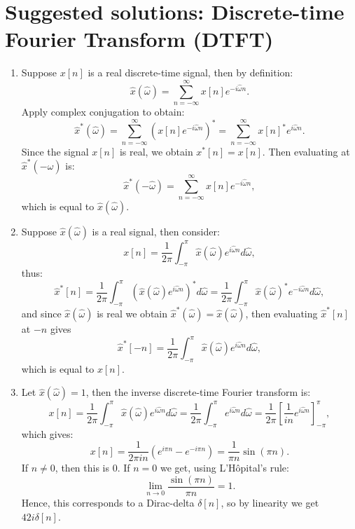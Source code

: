 
\newpage
\section{Suggested solutions: Discrete-time Fourier Transform (DTFT)}
\begin{enumerate}

  \item Suppose $x[n]$ is a real discrete-time signal, then by definition:
        \[ \hat{x}(\hat{\omega})=\sum_{n=-\infty}^{\infty}x[n]e^{-i\hat{\omega}n}. \]
        Apply complex conjugation to obtain:
        \[ \hat{x}^{*}(\hat{\omega})=\sum_{n=-\infty}^{\infty}(x[n]e^{-i\hat{\omega}n})^{*}=\sum_{n=-\infty}^{\infty}x[n]^{*}e^{i\hat{\omega}n}. \]
        Since the signal $x[n]$ is real, we obtain $x^{*}[n]=x[n]$. Then evaluating at $\hat{x}^{*}(-\hat{\omega})$ is:
        \[ \hat{x}^{*}(-\hat{\omega})=\sum_{n=-\infty}^{\infty}x[n]e^{-i\hat{\omega}n}, \]
        which is equal to $\hat{x}(\hat{\omega})$.

  \item Suppose $\hat{x}(\hat{\omega})$ is a real signal, then consider:
        \[ x[n]=\frac{1}{2\pi}\int_{-\pi}^{\pi}\hat{x}(\hat{\omega})e^{i\hat{\omega}n}d\hat{\omega}, \]
        thus:
        \[ \hat{x}^{*}[n]=\frac{1}{2\pi}\int_{-\pi}^{\pi}(\hat{x}(\hat{\omega})e^{i\hat{\omega}n})^{*}d\hat{\omega}=\frac{1}{2\pi}\int_{-\pi}^{\pi}\hat{x}(\hat{\omega})^{*}e^{-i\hat{\omega}n}d\hat{\omega}, \]
        and since $\hat{x}(\hat{\omega})$ is real we obtain $\hat{x}^{*}(\hat{\omega})=\hat{x}(\hat{\omega})$, then evaluating $\hat{x}^{*}[n]$ at $-n$ gives
        \[ \hat{x}^{*}[-n]=\frac{1}{2\pi}\int_{-\pi}^{\pi}\hat{x}(\hat{\omega})e^{i\hat{\omega}n}d\hat{\omega}, \]
        which is equal to $x[n]$.

  \item Let $\hat{x}(\hat{\omega})=1$, then the inverse discrete-time Fourier transform is:
        \[ x[n]=\frac{1}{2\pi}\int_{-\pi}^{\pi}\hat{x}(\hat{\omega})e^{i\hat{\omega}n}d\hat{\omega}=\frac{1}{2\pi}\int_{-\pi}^{\pi}e^{i\hat{\omega}n}d\hat{\omega}=\frac{1}{2\pi}\left[\frac{1}{in}e^{i\hat{\omega}n}\right]_{-\pi}^{\pi}, \]
        which gives:
        \[ x[n]=\frac{1}{2\pi in}(e^{i\pi n}-e^{-i\pi n})=\frac{1}{\pi n}\sin(\pi n). \]
        If $n\neq 0$, then this is $0$. If $n=0$ we get, using L'Hôpital's rule:
        \[ \lim_{n\to 0}\frac{\sin(\pi n)}{\pi n}=1. \]
        Hence, this corresponds to a Dirac-delta $\delta[n]$, so by linearity we get $42i\delta[n]$.


\end{enumerate}
